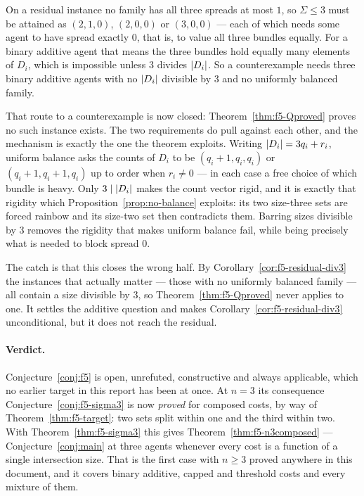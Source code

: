 \begin{remark}
\label{rem:f5-sigma3-odds}
On a residual instance no family has all three spreads at most $1$, so
$\Sigma \le 3$ must be attained as $(2,1,0)$, $(2,0,0)$ or $(3,0,0)$ --- each of
which needs some agent to have spread exactly $0$, that is, to value all three
bundles equally. For a binary additive agent that means the three bundles hold
equally many elements of $D_i$, which is impossible unless $3$ divides
$\left\lvert D_i\right\rvert$. So a counterexample needs three binary additive agents with no
$\left\lvert D_i\right\rvert$ divisible by $3$ and no uniformly balanced family.

That route to a counterexample is now closed:
Theorem~\ref{thm:f5-Qproved} proves no such instance exists. The two
requirements do pull against each other, and the mechanism is exactly the one
the theorem exploits. Writing $\left\lvert D_i\right\rvert = 3q_i + r_i$, uniform balance asks the
counts of $D_i$ to be $(q_i{+}1,q_i,q_i)$ or $(q_i{+}1,q_i{+}1,q_i)$ up to
order when $r_i \ne 0$ --- in each case a free choice of which bundle is heavy.
Only $3 \mid \left\lvert D_i\right\rvert$ makes the count vector rigid, and it is exactly that
rigidity which Proposition~\ref{prop:no-balance} exploits: its two size-three
sets are forced rainbow and its size-two set then contradicts them. Barring
sizes divisible by $3$ removes the rigidity that makes uniform balance fail,
while being precisely what is needed to block spread $0$.

The catch is that this closes the wrong half. By
Corollary~\ref{cor:f5-residual-div3} the instances that actually matter --- those
with no uniformly balanced family --- all contain a size divisible by $3$, so
Theorem~\ref{thm:f5-Qproved} never applies to one. It settles the additive
question and makes Corollary~\ref{cor:f5-residual-div3} unconditional, but it
does not reach the residual.
\end{remark}

\paragraph{Verdict.} Conjecture~\ref{conj:f5} is open, unrefuted, constructive
and always applicable, which no earlier target in this report has been at once.
At $n = 3$ its consequence Conjecture~\ref{conj:f5-sigma3} is now
\emph{proved} for composed costs, by way of
Theorem~\ref{thm:f5-target}: two sets split within one and the third within two.
With Theorem~\ref{thm:f5-sigma3} this gives
Theorem~\ref{thm:f5-n3composed} --- Conjecture~\ref{conj:main} at three agents
whenever every cost is a function of a single intersection size. That is the
first case with $n \ge 3$ proved anywhere in this document, and it covers binary
additive, capped and threshold costs and every mixture of them.

